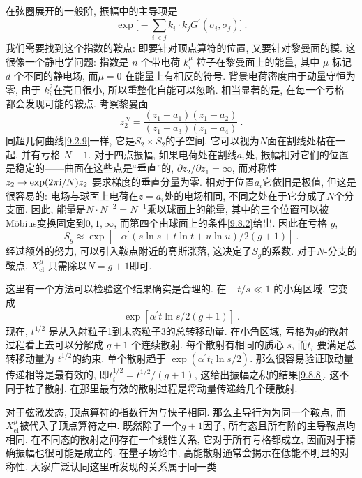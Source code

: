 在弦圈展开的一般阶, 振幅中的主导项是
\begin{equation}
	\exp \Biggl[-\sum_{i<j} k_{i} \cdot k_{j} G^{\prime}(\sigma_{i}, \sigma_{j})\Biggr] \:. \label{9.8.5}
\end{equation}
我们需要找到这个指数的鞍点: 即要针对顶点算符的位置, 又要针对黎曼面的模. 这很像一个静电学问题: 
指数是 $n$ 个带电荷 $k_{i}^{\mu}$ 粒子在黎曼面上的能量, 其中 $\mu$ 标记 $d$ 个不同的静电场, 而$\mu=0$ 在能量上有相反的符号. 
背景电荷密度由于动量守恒为零, 由于 $k_{i}^{2}$在壳且很小, 所以重整化自能可以忽略. 相当显著的是, 在每一个亏格 都会发现可能的鞍点. 考察黎曼面
\begin{equation}
	z_{2}^{N} = \frac{(z_{1}-a_{1})(z_{1}-a_{2})}{(z_{1}-a_{3})(z_{1}-a_{4})} \:. \label{9.8.6}
\end{equation}
同超几何曲线\eqref{9.2.9}一样, 它是$S_{2} \times S_{2}$的子空间. 它可以视为$N$面在割线处粘在一起, 并有亏格 $N{-}1$. 
对于四点振幅, 如果电荷处在割线$a_{i}$处, 振幅相对它们的位置是稳定的——曲面在这些点是``垂直''的, $\partial z_{2} / \partial z_{1}=\infty$, 
而对称性 $z_{2} \to \exp (2 \pi \mathrm{i} / N) z_{2}$ 要求梯度的垂直分量为零. 相对于位置$a_{i}$它依旧是极值, 但这是很容易的: 
电场与球面上电荷在$z=a_{i}$处的电场相同, 不同之处在于它分成了$N$个分支面. 因此, 能量是$N \cdot N^{-2}=N^{-1}$乘以球面上的能量, 
其中的三个位置可以被Möbius变换固定到$0,1,\infty$, 而第四个由球面上的条件\eqref{9.8.2}给出. 因此在亏格 $g$,
\begin{equation}
	S_{g} \approx \exp [-\alpha^{\prime}(s \ln s + t \ln t + u \ln u) / 2(g+1)] \:. \label{9.8.7}
\end{equation}
经过额外的努力, 可以引入鞍点附近的高斯涨落, 这决定了$S_{g}$的系数. 对于$N$-分支的鞍点, $X_{\mathrm{cl}}^{\mu}$ 只需除以$N=g{+}1$即可.

这里有一个方法可以检验这个结果确实是合理的. 在 $-t / s \ll 1$ 的小角区域, 它变成
\begin{equation}
	\exp [\alpha^{\prime} t \ln s / 2(g+1)] \:. \label{9.8.8}
\end{equation}
现在, $t^{1 / 2}$ 是从入射粒子1到末态粒子3的总转移动量. 在小角区域, 亏格为$g$的散射过程看上去可以分解成 $g{+}1$ 个连续散射. 
每个散射有相同的质心 $s$, 而$t_{i}$ 要满足总转移动量为 $t^{1 / 2}$的约束. 单个散射趋于 $\exp (\alpha^{\prime} t_{i} \ln s / 2)$. 
那么很容易验证取动量传递相等是最有效的, 即$t_{i}^{1/2}=t^{1/2} /(g+1)$, 这给出振幅之积的结果\eqref{9.8.8}. 
这不同于粒子散射, 在那里最有效的散射过程是将动量传递给几个硬散射.

对于弦激发态, 顶点算符的指数行为与快子相同. 那么主导行为为同一个鞍点, 而$X_{\mathrm{cl}}^{\mu}$被代入了顶点算符之中. 
既然除了一个$g+1$因子, 所有态且所有阶的主导鞍点均相同, 在不同态的散射之间存在一个线性关系, 它对于所有亏格都成立, 因而对于精确振幅也很可能是成立的. 
在量子场论中, 高能散射通常会揭示在低能不明显的对称性. 大家广泛认同这里所发现的关系属于同一类.

